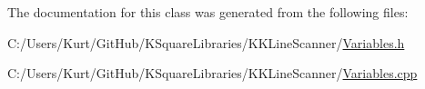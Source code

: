 The documentation for this class was generated from the following files\+:\begin{DoxyCompactItemize}
\item 
C\+:/\+Users/\+Kurt/\+Git\+Hub/\+K\+Square\+Libraries/\+K\+K\+Line\+Scanner/\hyperlink{_variables_8h}{Variables.\+h}\item 
C\+:/\+Users/\+Kurt/\+Git\+Hub/\+K\+Square\+Libraries/\+K\+K\+Line\+Scanner/\hyperlink{_variables_8cpp}{Variables.\+cpp}\end{DoxyCompactItemize}

